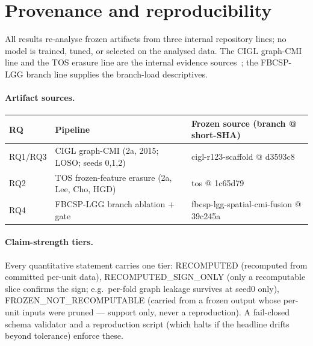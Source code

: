 \section{Provenance and reproducibility}
\label{app:provenance}

All results re-analyse frozen artifacts from three internal repository lines; no model is trained,
tuned, or selected on the analysed data. The CIGL graph-CMI line and the TOS erasure line are the
internal evidence sources~\citep{cigl_internal,tos_cmi_internal}; the FBCSP-LGG branch line supplies the
branch-load descriptives.

\paragraph{Artifact sources.}
\begin{center}\small
\begin{tabular}{lll}
\toprule
RQ & Pipeline & Frozen source (branch @ short-SHA) \\
\midrule
RQ1/RQ3 & CIGL graph-CMI (2a, 2015; LOSO; seeds 0,1,2) & cigl-r123-scaffold @ d3593c8 \\
RQ2 & TOS frozen-feature erasure (2a, Lee, Cho, HGD) & tos @ 1c65d79 \\
RQ4 & FBCSP-LGG branch ablation + gate & fbcsp-lgg-spatial-cmi-fusion @ 39c245a \\
\bottomrule
\end{tabular}
\end{center}

\paragraph{Claim-strength tiers.} Every quantitative statement carries one tier:
\textsf{RECOMPUTED} (recomputed from committed per-unit data), \textsf{RECOMPUTED\_SIGN\_ONLY} (only a
recomputable slice confirms the sign; e.g.\ per-fold graph leakage survives at seed0 only),
\textsf{FROZEN\_NOT\_RECOMPUTABLE} (carried from a frozen output whose per-unit inputs were pruned ---
support only, never a reproduction). A fail-closed schema validator and a reproduction script (which
halts if the headline drifts beyond tolerance) enforce these.

